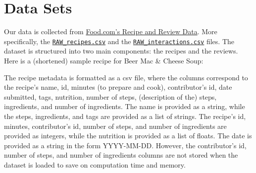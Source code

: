 \documentclass[fontsize=11pt]{article}
\begin{document}
\section{Data Sets}
Our data is collected from \href{https://cseweb.ucsd.edu/~jmcauley/datasets.html#foodcom}{Food.com's Recipe and Review Data}. More specifically, the \href{https://www.kaggle.com/datasets/shuyangli94/food-com-recipes-and-user-interactions/data?select=RAW_recipes.csv}{\texttt{RAW\_recipes.csv}} and the \href{https://www.kaggle.com/datasets/shuyangli94/food-com-recipes-and-user-interactions/data?select=RAW_interactions.csv}{\texttt{RAW\_interactions.csv}} files. The dataset is structured into two main components: the recipes and the reviews. Here is a (shortened) sample recipe for Beer Mac \& Cheese Soup:
The recipe metadata is formatted as a csv file, where the columns correspond to the recipe's name, id, minutes (to prepare and cook), contributor's id, date submitted, tags, nutrition, number of steps, (description of the) steps, ingredients, and number of ingredients. The name is provided as a string, while the steps, ingredients, and tags are provided as a list of strings. The recipe's id, minutes, contributor's id, number of steps, and number of ingredients are provided as integers, while the nutrition is provided as a list of floats. The date is provided as a string in the form YYYY-MM-DD. However, the contributor's id, number of steps, and number of ingredients columns are not stored when the dataset is loaded to save on computation time and memory. \\
\end{document}
